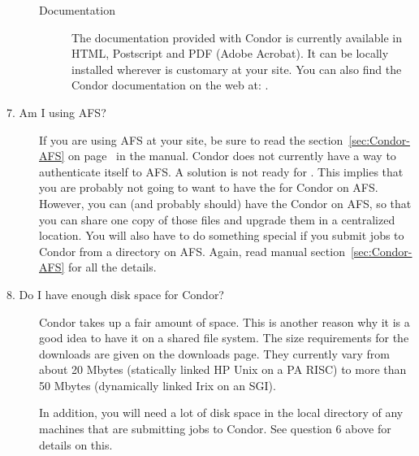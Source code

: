 \begin{description}
\begin{description}
\item[Documentation]

The documentation provided with Condor is currently available in
     HTML, Postscript and PDF (Adobe Acrobat).  It can be locally installed
     wherever is customary at your site.  You can also find the Condor
     documentation on the web at:
     .

\end{description}

\item[7. Am I using AFS?]

If you are using AFS at your site, be sure to read the
section~\ref{sec:Condor-AFS} on page~\pageref{sec:Condor-AFS} in the
manual.
Condor does not currently have a way to authenticate itself to AFS.
A solution is not ready for
\VersionNotice.
This implies that you are probably not going to want
to have the  for Condor on AFS.
However, you can
(and probably should) have the Condor  on AFS, so
that you can share one copy of those files and upgrade them in a
centralized location.  You will also have to do something special if
you submit jobs to Condor from a directory on AFS.  Again, read manual
section~\ref{sec:Condor-AFS} for all the details.

\item[8. Do I have enough disk space for Condor?]

Condor takes up a fair amount of space.
This is another reason why it is a good idea to have it on a shared
file system.
The size requirements for the downloads are given on the
downloads page.
They currently vary from about 20 Mbytes (statically linked HP Unix
on a PA RISC)
to more than 50 Mbytes (dynamically linked Irix on an SGI).



In addition, you will need a lot of disk space in the local directory
of any machines that are submitting jobs to Condor.  See question 6
above for details on this.

\end{description}

